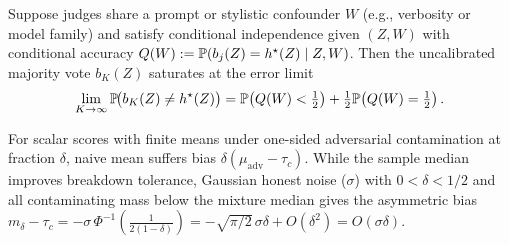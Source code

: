 \begin{theorem}
\label{thm:confounded-consensus}
Suppose judges share a prompt or stylistic confounder $W$ (e.g., verbosity or
model family) and satisfy conditional independence given $(Z, W)$ with
conditional accuracy $Q(W) := \mathbb{P}(b_j(Z) = h^\star(Z) \mid Z, W)$. Then the
uncalibrated majority vote $b_K(Z)$ saturates at the error limit
\begin{equation}
\lim_{K \to \infty}\mathbb{P}\!\big(b_K(Z) \neq h^\star(Z)\big)
  = \mathbb{P}\!\left(Q(W) < \tfrac{1}{2}\right) + \tfrac{1}{2}\mathbb{P}\!\left(Q(W) = \tfrac{1}{2}\right).
\end{equation}
\end{theorem}

\begin{proposition}
\label{prop:robust-aggregation}
For scalar scores with finite means under one-sided adversarial
contamination at fraction $\delta$, naive mean suffers bias $\delta(\mu_{\mathrm{adv}} - \tau_c)$.
While the sample median improves breakdown tolerance, Gaussian honest noise
($\sigma$) with $0<\delta<1/2$ and all contaminating mass below the mixture median gives the
asymmetric bias $m_\delta - \tau_c = -\sigma\,\Phi^{-1}(\frac{1}{2(1-\delta)})
= -\sqrt{\pi/2}\,\sigma\delta + O(\delta^2) = O(\sigma\delta)$.
\end{proposition}

